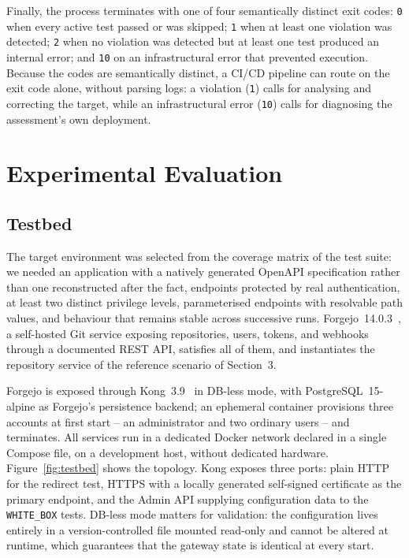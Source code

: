 \documentclass[
]{ceurart}
\begin{document}
Finally, the process terminates with one of four semantically distinct exit codes: \texttt{0} when every active test passed or was skipped; \texttt{1} when at least one violation was detected; \texttt{2} when no violation was detected but at least one test produced an internal error; and \texttt{10} on an infrastructural error that prevented execution.
Because the codes are semantically distinct, a CI/CD pipeline can route on the exit code alone, without parsing logs: a violation (\texttt{1}) calls for analysing and correcting the target, while an infrastructural error (\texttt{10}) calls for diagnosing the assessment's own deployment.

\section{Experimental Evaluation}
\label{sec:eval}

\subsection{Testbed}

The target environment was selected from the coverage matrix of the test suite: we needed an application with a natively generated OpenAPI specification rather than one reconstructed after the fact, endpoints protected by real authentication, at least two distinct privilege levels, parameterised endpoints with resolvable path values, and behaviour that remains stable across successive runs.
Forgejo~14.0.3~\cite{forgejoContributors2026}, a self-hosted Git service exposing repositories, users, tokens, and webhooks through a documented REST API, satisfies all of them, and instantiates the repository service of the reference scenario of Section~3.

Forgejo is exposed through Kong~3.9~\cite{kongGateway2026} in DB-less mode, with PostgreSQL~15-alpine as Forgejo's persistence backend; an ephemeral container provisions three accounts at first start -- an administrator and two ordinary users -- and terminates.
All services run in a dedicated Docker network declared in a single Compose file, on a development host, without dedicated hardware.
Figure~\ref{fig:testbed} shows the topology.
Kong exposes three ports: plain HTTP for the redirect test, HTTPS with a locally generated self-signed certificate as the primary endpoint, and the Admin API supplying configuration data to the \texttt{WHITE\_BOX} tests.
DB-less mode matters for validation: the configuration lives entirely in a version-controlled file mounted read-only and cannot be altered at runtime, which guarantees that the gateway state is identical at every start.
\end{document}
